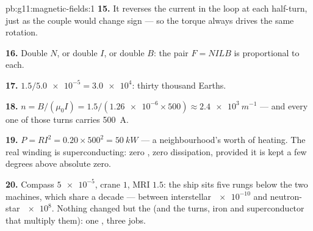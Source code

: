 \begin{solution}{pb:g11:magnetic-fields:1}
\textbf{15.} It reverses the current in the loop at each half-turn,
just as the couple would change sign --- so the torque always drives
the same rotation.

\textbf{16.} Double $N$, or double $I$, or double $B$: the  pair
$F = NILB$ is proportional to each.

\textbf{17.} $1.5 / \num{5.0e-5} = \num{3.0e4}$: thirty thousand
Earths.

\textbf{18.} $n = B/(\mu_0 I) = 1.5 / (\num{1.26e-6} \times 500)
\approx \qty{2.4e3}{m^{-1}}$ --- and every one of those turns carries
\qty{500}{A}.

\textbf{19.} $P = RI^2 = 0.20 \times 500^2 = \qty{50}{kW}$ --- a
neighbourhood's worth of heating. The real winding is
superconducting: zero , zero dissipation, provided it is
kept a few degrees above absolute zero.

\textbf{20.} Compass $\num{5e-5}$, crane $1$, MRI $1.5$: the ship
sits five rungs below the two machines, which share a decade ---
between interstellar $\num{e-10}$ and neutron-star $\num{e8}$. Nothing
changed but the  (and the turns, iron and superconductor that
multiply them): one , three jobs.
\end{solution}
